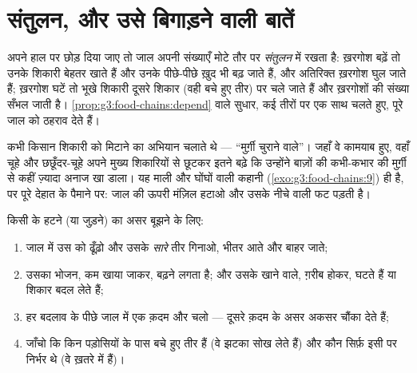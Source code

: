 \section{संतुलन, और उसे बिगाड़ने वाली बातें}

\begin{proposition}[जाल का संतुलन]\label{prop:g5:food-webs:balance}
अपने हाल पर छोड़ दिया जाए तो जाल अपनी संख्याएँ मोटे तौर पर
\emph{संतुलन} में रखता है: ख़रगोश बढ़ें तो
उनके शिकारी बेहतर खाते हैं और उनके पीछे-पीछे ख़ुद भी बढ़ जाते हैं, और
अतिरिक्त ख़रगोश घुल जाते हैं; ख़रगोश घटें तो भूखे शिकारी दूसरे शिकार
(वही बचे हुए तीर) पर चले जाते हैं और ख़रगोशों की संख्या सँभल जाती है।
\cref{prop:g3:food-chains:depend} वाले सुधार, कई तीरों पर एक साथ
चलते हुए, पूरे जाल को ठहराव देते हैं।
\end{proposition}
\admitted

\begin{example}[वह मशहूर ग़लती]\label{ex:g5:food-webs:mistake}
कभी किसान शिकारी  को मिटाने का अभियान चलाते थे --- ``मुर्ग़ी
चुराने वाले''। जहाँ वे कामयाब हुए, वहाँ चूहे और छछूँदर-चूहे अपने मुख्य
शिकारियों से छूटकर इतने बढ़े कि उन्होंने बाज़ों की कभी-कभार की मुर्ग़ी
से कहीं ज़्यादा अनाज खा डाला। यह माली और घोंघों वाली कहानी
(\cref{exo:g3:food-chains:9}) ही है, पर पूरे देहात के पैमाने पर: जाल
की ऊपरी मंज़िल हटाओ और उसके नीचे वाली फट पड़ती है।
\end{example}

\begin{method}[गड़बड़ी की भविष्यवाणी]\label{met:g5:food-webs:predict}
किसी  के हटने (या जुड़ने) का असर बूझने के लिए:
\begin{enumerate}
  \item जाल में उस  को ढूँढ़ो और उसके \emph{सारे} तीर गिनाओ,
        भीतर आते और बाहर जाते;
  \item उसका भोजन, कम खाया जाकर, बढ़ने लगता है; और उसके खाने वाले,
        ग़रीब होकर, घटते हैं या शिकार बदल लेते हैं;
  \item हर बदलाव के पीछे जाल में एक क़दम और चलो --- दूसरे क़दम के असर
        अकसर चौंका देते हैं;
  \item जाँचो कि किन पड़ोसियों के पास बचे हुए तीर हैं (वे झटका सोख
        लेते हैं) और कौन सिर्फ़ इसी  पर निर्भर थे (वे ख़तरे में
        हैं)।
\end{enumerate}
\end{method}


